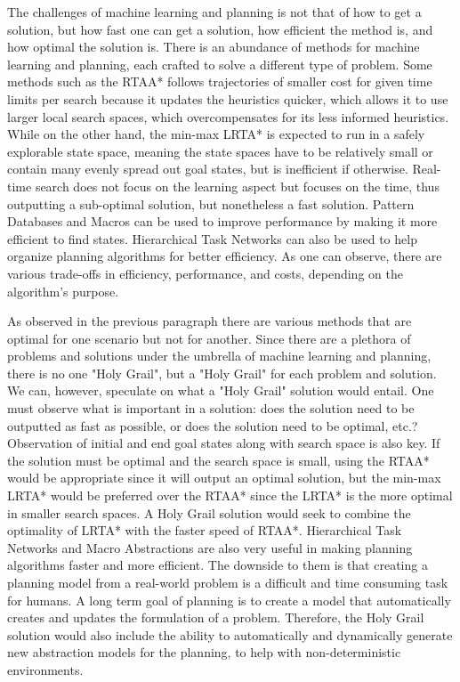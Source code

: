 \documentclass[tog]{acmsiggraph}
\begin{document}
The challenges of machine learning and planning is not that of how to get a solution, but how fast one can get a solution, how efficient the method is, and how optimal the solution is. There is an abundance of methods for machine learning and planning, each crafted to solve a different type of problem. Some methods such as the RTAA* follows trajectories of smaller cost for given time limits per search because it updates the heuristics quicker, which allows it to use larger local search spaces, which overcompensates for its less informed heuristics. While on the other hand, the min-max LRTA* is expected to run in a safely explorable state space, meaning the state spaces have to be relatively small or contain many evenly spread out goal states, but is inefficient if otherwise. Real-time search does not focus on the learning aspect but focuses on the time, thus outputting a sub-optimal solution, but nonetheless a fast solution. Pattern Databases and Macros can be used to improve performance by making it more efficient to find states. Hierarchical Task Networks can also be used to help organize planning algorithms for better efficiency. As one can observe, there are various trade-offs in efficiency, performance, and costs, depending on the algorithm's purpose.

As observed in the previous paragraph there are various methods that are optimal for one scenario but not for another. Since there are a plethora of problems and solutions under the umbrella of machine learning and planning, there is no one "Holy Grail", but a "Holy Grail" for each problem and solution. We can, however, speculate on what a "Holy Grail" solution would entail. One must observe what is important in a solution: does the solution need to be outputted as fast as possible, or does the solution need to be optimal, etc.? Observation of initial and end goal states along with search space is also key. If the solution must be optimal and the search space is small, using the RTAA* would be appropriate since it will output an optimal solution, but the min-max LRTA* would be preferred over the RTAA* since the LRTA* is the more optimal in smaller search spaces. A Holy Grail solution would seek to combine the optimality of LRTA* with the faster speed of RTAA*. Hierarchical Task Networks and Macro Abstractions are also very useful in making planning algorithms faster and more efficient. The downside to them is that creating a planning model from a real-world problem is a difficult and time consuming task for humans. A long term goal of planning is to create a model that automatically creates and updates the formulation of a problem. Therefore, the Holy Grail solution would also include the ability to automatically and dynamically generate new abstraction models for the planning, to help with non-deterministic environments.
\end{document}
